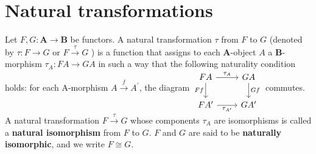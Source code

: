 \section{Natural transformations}
Let $F, G: \mathbf{A} \rightarrow \mathbf{B}$ be functors. A natural transformation $\tau$ from $F$ to $G$ (denoted by $\tau: F \rightarrow G$ or $F \xrightarrow{\tau} G$ ) is a function that assigns to each $\mathbf{A}$-object $A$ a $\mathbf{B}$-morphism $\tau_A: F A \rightarrow G A$ in such a way that the following naturality condition holds: for each A-morphism $A \xrightarrow{f} A^{\prime}$, the diagram
$
\begin{tikzcd}
FA \arrow[r, "\tau_A"] \arrow[d, "Ff"'] & GA \arrow[d, "Gf"] \\
FA' \arrow[r, "\tau_{A'}"'] & GA'
\end{tikzcd}
$ commutes.\\
A natural transformation $F \xrightarrow{\tau} G$ whose components $\tau_A$ are isomorphisms is called a \textbf{natural isomorphism} from $F$ to $G$. $F$ and $G$ are said to be \textbf{naturally isomorphic}, and we write $F \cong G$.


